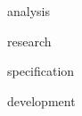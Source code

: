 \documentclass[12pt]{report}
\begin{document}




\newpage
\tableofcontents

\newpage
\listoffigures

\newpage
\listoftables

{analysis}

{research}

{specification}

{development}





\end{document}
